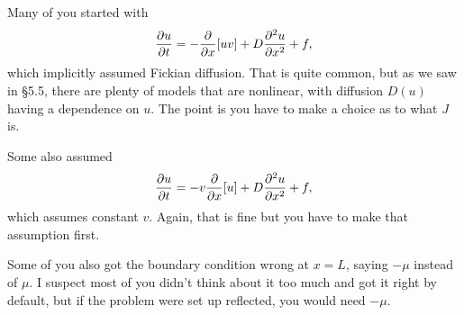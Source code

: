\documentclass[a4paper,12pt]{article}
\begin{document}
\begin{enumerate}
{\begin{enumerate}
{    Many of you started with 
    \begin{equation}
    \pd{u}{t} = -\pd{}{x}[uv] +D\pdd{u}{x} + f,
    \end{equation}
    which implicitly assumed Fickian diffusion. That is quite common, but as we saw in \S5.5, there are plenty of models that are nonlinear, with diffusion $D(u)$ having a dependence on $u$. The point is you have to make a choice as to what $J$ is.

    Some also assumed 
    \begin{equation}
    \pd{u}{t} = -v\pd{}{x}[u] +D\pdd{u}{x} + f,
    \end{equation}
    which assumes constant $v$. Again, that is fine but you have to make that assumption first.
    
    Some of you also got the boundary condition wrong at $x=L$, saying $-\mu$ instead of $\mu$. I suspect most of you didn't think about it too much and got it right by default, but if the problem were set up reflected, you would need $-\mu$.
          }



\end{enumerate}}
\end{enumerate}
\end{document}

